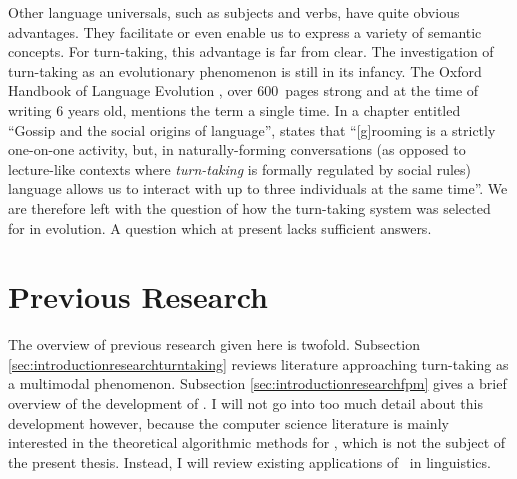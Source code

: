 Other language universals, such as subjects and verbs, have quite obvious advantages.
They facilitate or even enable us to express a variety of semantic concepts.
For turn-taking, this advantage is far from clear.
The investigation of turn-taking as an evolutionary phenomenon is still in its infancy.
The Oxford Handbook of Language Evolution \citep{tallerman_oxford_2012}, over 600~pages strong and at the time of writing 6 years old, mentions the term a single time.
In a chapter entitled ``Gossip and the social origins of language'', \citet[, emphasis mine]{dunbar_gossip_2012} states that ``[g]rooming is a strictly one-on-one activity, but, in naturally-forming conversations (as opposed to lecture-like contexts where \emph{turn-taking} is formally regulated by social rules) language allows us to interact with up to three individuals at the same time''.
We are therefore left with the question of how the turn-taking system was selected for in evolution.
A question which at present lacks sufficient answers.




\section{Previous Research}
\label{sec:introductionresearch}
The overview of previous research given here is twofold. Subsection \ref{sec:introductionresearchturntaking} reviews literature approaching turn-taking as a multimodal phenomenon.
Subsection \ref{sec:introductionresearchfpm} gives a brief overview of the development of \fpmlower.
I will not go into too much detail about this development however, because the computer science literature is mainly interested in the theoretical algorithmic methods for \fpmlower, which is not the subject of the present thesis.
Instead, I will review existing applications of \fpmlower\ in linguistics.



